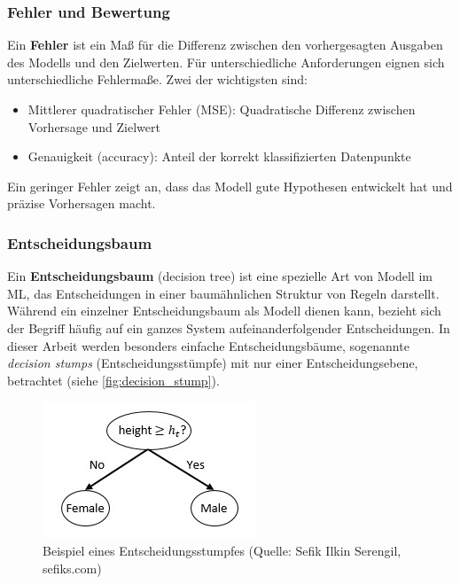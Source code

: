 \subsubsection{Fehler und Bewertung}
Ein \textbf{Fehler} ist ein Maß für die Differenz zwischen den vorhergesagten Ausgaben des Modells und den Zielwerten. Für unterschiedliche Anforderungen eignen sich unterschiedliche Fehlermaße. Zwei der wichtigsten sind:

\begin{itemize}
    \item Mittlerer quadratischer Fehler (MSE): Quadratische Differenz zwischen Vorhersage und Zielwert
    \item Genauigkeit (accuracy): Anteil der korrekt klassifizierten Datenpunkte
\end{itemize}
Ein geringer Fehler zeigt an, dass das Modell gute Hypothesen entwickelt hat und präzise Vorhersagen macht.

\subsubsection{Entscheidungsbaum}
Ein \textbf{Entscheidungsbaum} (decision tree) ist eine spezielle Art von Modell im ML, das Entscheidungen in einer baumähnlichen Struktur von Regeln darstellt. Während ein einzelner Entscheidungsbaum als Modell dienen kann, bezieht sich der Begriff häufig auf ein ganzes System aufeinanderfolgender Entscheidungen. In dieser Arbeit werden besonders einfache Entscheidungsbäume, sogenannte \textit{decision stumps} (Entscheidungsstümpfe) mit nur einer Entscheidungsebene, betrachtet (siehe \autoref{fig:decision_stump}).

\begin{figure}[h]
    \centering
    \includegraphics[width=0.5\linewidth]{Images/decision_stump.png}
    \caption[Beispiel eines Entscheidungsstumpfes]{Beispiel eines Entscheidungsstumpfes (Quelle: Sefik Ilkin Serengil, sefiks.com)}
    \label{fig:decision_stump}
\end{figure}

